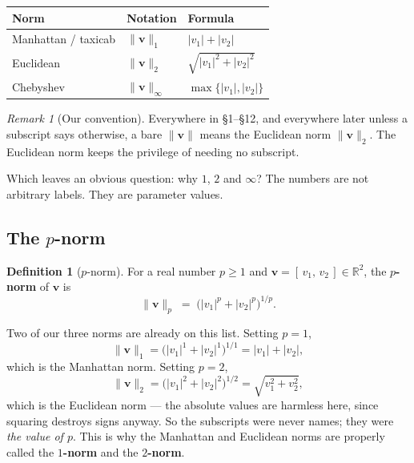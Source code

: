 \documentclass[11pt]{article}
\theoremstyle{definition}
\newtheorem{defn}{Definition}
\theoremstyle{remark}
\newtheorem*{rmk}{Remark}
\newcommand{\R}{\mathbb{R}}
\newcommand{\vc}[1]{\mathbf{#1}}
\newcommand{\norm}[1]{\lVert #1\rVert}
\begin{document}
\begin{center}
\renewcommand{\arraystretch}{1.6}
\begin{tabular}{@{}l l l@{}}
\toprule
\textbf{Norm} & \textbf{Notation} & \textbf{Formula} \\
\midrule
Manhattan / taxicab & $\norm{\vc{v}}_1$
  & $\lvert v_1\rvert+\lvert v_2\rvert$ \\
Euclidean           & $\norm{\vc{v}}_2$
  & $\sqrt{\lvert v_1\rvert^{2}+\lvert v_2\rvert^{2}}$ \\
Chebyshev           & $\norm{\vc{v}}_\infty$
  & $\max\bigl\{\lvert v_1\rvert,\lvert v_2\rvert\bigr\}$ \\
\bottomrule
\end{tabular}
\end{center}

\begin{rmk}[Our convention]
Everywhere in \S1--\S12, and everywhere later unless a subscript says
otherwise, a bare $\norm{\vc{v}}$ means the Euclidean norm $\norm{\vc{v}}_2$.
The Euclidean norm keeps the privilege of needing no subscript.
\end{rmk}

\noindent Which leaves an obvious question: why $1$, $2$ and $\infty$? The
numbers are not arbitrary labels. They are parameter values.

\subsection{The $p$-norm}
\begin{defn}[$p$-norm]
For a real number $p\ge 1$ and $\vc{v}=[\,v_1,\,v_2\,]\in\R^{2}$, the
\textbf{$p$-norm} of $\vc{v}$ is
\[
  \norm{\vc{v}}_p
  \;=\;
  \bigl(\lvert v_1\rvert^{p}+\lvert v_2\rvert^{p}\bigr)^{1/p} .
\]
\end{defn}

\noindent Two of our three norms are already on this list. Setting $p=1$,
\[
  \norm{\vc{v}}_1
  = \bigl(\lvert v_1\rvert^{1}+\lvert v_2\rvert^{1}\bigr)^{1/1}
  = \lvert v_1\rvert+\lvert v_2\rvert ,
\]
which is the Manhattan norm. Setting $p=2$,
\[
  \norm{\vc{v}}_2
  = \bigl(\lvert v_1\rvert^{2}+\lvert v_2\rvert^{2}\bigr)^{1/2}
  = \sqrt{v_1^{2}+v_2^{2}} ,
\]
which is the Euclidean norm --- the absolute values are harmless here, since
squaring destroys signs anyway. So the subscripts were never names; they were
\emph{the value of $p$}. This is why the Manhattan and Euclidean norms are
properly called the \textbf{$1$-norm} and the \textbf{$2$-norm}.
\end{document}
